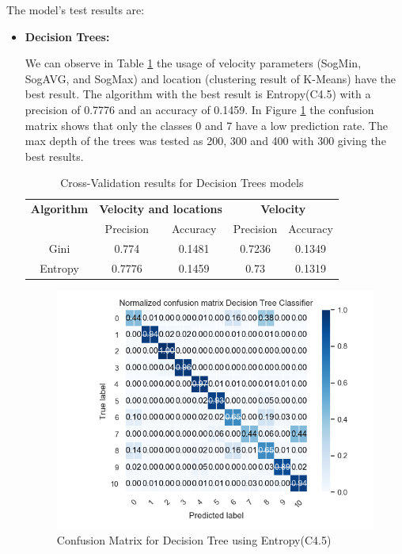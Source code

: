 The model's test results are:
\newpage
\begin{itemize}
\item \textbf{ Decision Trees: }

We can observe in Table \ref{table:cross_val_dt} the usage of velocity parameters (SogMin, SogAVG, and SogMax) and location (clustering result of K-Means) have the best result. The algorithm with the best result is Entropy(C4.5) with a precision of 0.7776 and an accuracy of 0.1459. In Figure \ref{table:cross_val_dt} the confusion matrix shows that only the classes 0 and 7 have a low prediction rate. The max depth of the trees was tested as 200, 300 and 400 with 300 giving the best results.


\begin {table}[H]
\begin{center}
\begin{tabular}{c|c|c|c|c}
\multicolumn{1}{c|}{\textbf{Algorithm } }   &\multicolumn{2}{c|}{\textbf{ Velocity and locations}}& \multicolumn{2}{c}{\textbf{ Velocity}}\\
&Precision & Accuracy & Precision & Accuracy \\
\hline
Gini   &0.774&0.1481&0.7236&0.1349\\
Entropy&0.7776&0.1459&0.73&0.1319
\label{table:cross_val_dt}
\end{tabular}
\caption {Cross-Validation results for Decision Trees models}
\end{center}
\end {table}

\begin{figure}[h]
    \centering
    \includegraphics[width=0.8\linewidth]{Chapters/img/CM_DT.png}
    \caption{Confusion Matrix for Decision Tree using Entropy(C4.5)}
    \label{fig:cm_dt}
\end{figure}



\end{itemize}
